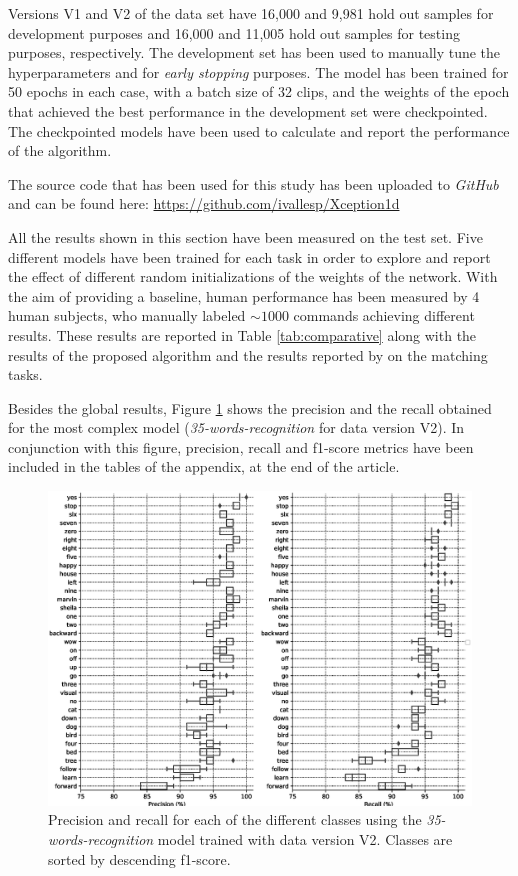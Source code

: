 \documentclass[review]{elsarticle}
\begin{document}
Versions V1 and V2 of the data set have 16,000 and 9,981 hold out samples for development purposes and 16,000 and 11,005 hold out samples for testing purposes, respectively. The development set has been used to manually tune the hyperparameters and for \textit{early stopping} purposes. The model has been trained for 50 epochs in each case, with a batch size of 32 clips, and the weights of the epoch that achieved the best performance in the development set were checkpointed. The checkpointed models have been used to calculate and report the performance of the algorithm.

 The source code that has been used for this study has been uploaded to \textit{GitHub} and can be found here: \url{https://github.com/ivallesp/Xception1d}

All the results shown in this section have been measured on the test set. Five different models have been trained for each task in order to explore and report the effect of different random initializations of the weights of the network. With the aim of providing a baseline, human performance has been measured by 4 human subjects, who manually labeled $\sim 1000$ commands achieving different results. These results are reported in Table \ref{tab:comparative} along with the results of the proposed algorithm and the results reported by \cite{Andrade2018, Zhang2017, McMahan2018, Warden2018} on the matching tasks.

Besides the global results, Figure \ref{fig:boxplot35002} shows the precision and the recall obtained for the most complex model (\textit{35-words-recognition} for data version V2). In conjunction with this figure, precision, recall and f1-score metrics have been included in the tables of the appendix, at the end of the article. 

\begin{figure}[ht]
	\centering
	\includegraphics[width=1.0\linewidth]{img/boxplot_35-words-recognition_002.eps}
	\caption{Precision and recall for each of the different classes using the \textit{35-words-recognition} model trained with data version V2. Classes are sorted by descending f1-score.}
	\label{fig:boxplot35002}
\end{figure}
\end{document}
